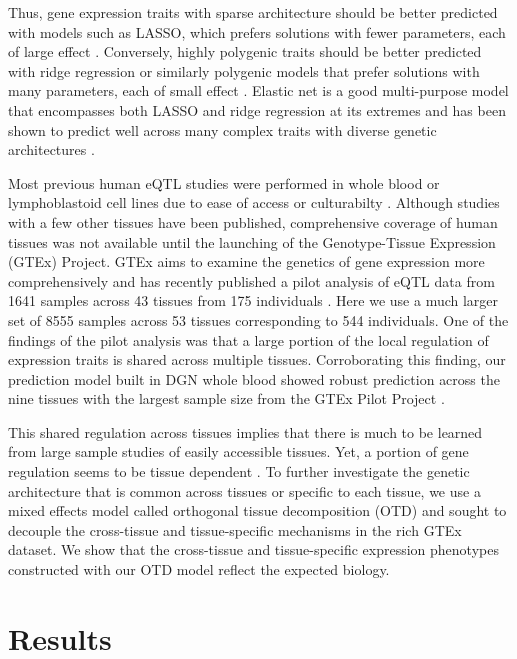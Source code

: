 \documentclass[10pt,letterpaper]{article}
\begin{document}
Thus, gene expression traits with sparse architecture should be better predicted with models such as LASSO, which prefers solutions with fewer parameters, each of large effect \cite{Tibshirani_1996}. Conversely, highly polygenic traits should be better predicted with ridge regression or similarly polygenic models that prefer solutions with many parameters, each of small effect \cite{Hoerl_1970,de_los_Campos_2010,Wheeler_2014}. Elastic net \cite{Zou_2005} is a good multi-purpose model that encompasses both LASSO and ridge regression at its extremes and has been shown to predict well across many complex traits with diverse genetic architectures \cite{abraham2013performance}. 

Most previous human eQTL studies were performed in whole blood or lymphoblastoid cell lines due to ease of access or culturabilty \cite{Stranger_2007,Cheung_2005,Battle_2013}. Although studies with a few other tissues have been published, comprehensive coverage of human tissues was not available until the launching of the Genotype-Tissue Expression (GTEx) Project. GTEx aims to examine the genetics of gene expression more comprehensively and has recently published a pilot analysis of eQTL data from 1641 samples across 43 tissues from 175 individuals \cite{Ardlie_2015}. Here we use a much larger set of 8555 samples across 53 tissues corresponding to 544 individuals. One of the findings of the pilot analysis was that a large portion of the local regulation of expression traits is shared across multiple tissues. Corroborating this finding, our prediction model built in DGN whole blood showed robust prediction \cite{Gamazon_2015} across the nine tissues with the largest sample size from the GTEx Pilot Project \cite{Ardlie_2015}.

This shared regulation across tissues implies that there is much to be learned from large sample studies of easily accessible tissues. Yet, a portion of gene regulation seems to be tissue dependent \cite{Ardlie_2015}. To further investigate the genetic architecture that is common across tissues or specific to each tissue, we use a mixed effects model called orthogonal tissue decomposition (OTD) and sought to decouple the cross-tissue and tissue-specific mechanisms in the rich GTEx dataset. We show that the cross-tissue and tissue-specific expression phenotypes constructed with our OTD model reflect the expected biology. 

\section*{Results}
\end{document}
